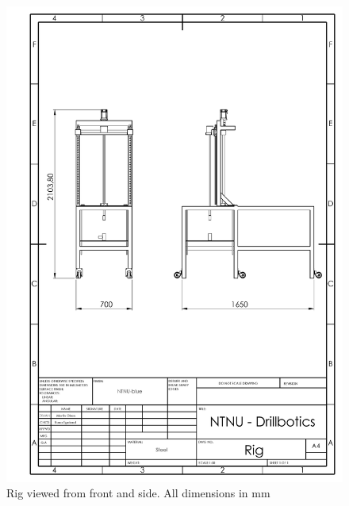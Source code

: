 \newpage
\begin{figure} [H]
\centering
\includegraphics[width=1.0\textwidth]{figures/mechdrawings/Rigfrontandside.JPG}
\caption{Rig viewed from front and side. All dimensions in mm} 
\label{fig:rigview}
\end{figure}

